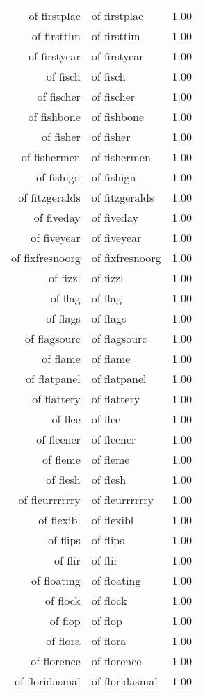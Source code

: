 \begin{table}[ht]
\begin{tabular}{rlr}
  of firstplac & of firstplac & 1.00 \\ 
  of firsttim & of firsttim & 1.00 \\ 
  of firstyear & of firstyear & 1.00 \\ 
  of fisch & of fisch & 1.00 \\ 
  of fischer & of fischer & 1.00 \\ 
  of fishbone & of fishbone & 1.00 \\ 
  of fisher & of fisher & 1.00 \\ 
  of fishermen & of fishermen & 1.00 \\ 
  of fishign & of fishign & 1.00 \\ 
  of fitzgeralds & of fitzgeralds & 1.00 \\ 
  of fiveday & of fiveday & 1.00 \\ 
  of fiveyear & of fiveyear & 1.00 \\ 
  of fixfresnoorg & of fixfresnoorg & 1.00 \\ 
  of fizzl & of fizzl & 1.00 \\ 
  of flag & of flag & 1.00 \\ 
  of flags & of flags & 1.00 \\ 
  of flagsourc & of flagsourc & 1.00 \\ 
  of flame & of flame & 1.00 \\ 
  of flatpanel & of flatpanel & 1.00 \\ 
  of flattery & of flattery & 1.00 \\ 
  of flee & of flee & 1.00 \\ 
  of fleener & of fleener & 1.00 \\ 
  of fleme & of fleme & 1.00 \\ 
  of flesh & of flesh & 1.00 \\ 
  of fleurrrrrry & of fleurrrrrry & 1.00 \\ 
  of flexibl & of flexibl & 1.00 \\ 
  of flips & of flips & 1.00 \\ 
  of flir & of flir & 1.00 \\ 
  of floating & of floating & 1.00 \\ 
  of flock & of flock & 1.00 \\ 
  of flop & of flop & 1.00 \\ 
  of flora & of flora & 1.00 \\ 
  of florence & of florence & 1.00 \\ 
  of floridasmal & of floridasmal & 1.00 \\ 

\end{tabular}
\end{table}
